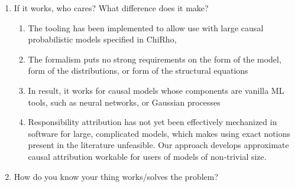 \documentclass{article}
\begin{document}
\begin{enumerate}
\begin{enumerate}
    \item push-forward causal impact score for variables of different types and supports, including allowing for continuous causes, witnesses, and outcomes
    \item using integration instead of existential quantifier, with the idea that this is closer to normality considerations
    \item This is achieved by causal probabilistic model transformations, which allow us to turn search into an inference problem (refer to search as inference stuff).
     \item This allows for the use of well-established approximation algorithms, which makes approximate search for explanations computationally feasible even for large-scale causal probabilistic models (refer to the HouseIQ example)
        

    \end{enumerate}
    \item If it works, who cares? What difference does it make?
    \begin{enumerate}
    \item The tooling has been implemented to allow use with large causal probabilistic models
    specified in ChiRho, 
    \item The formalism puts no strong requirements on the form of the model, form of the distributions, or form of the structural equations
    \item In result, it works for causal models whose components are vanilla ML tools, such as neural networks, or Gaussian processes
    \item Responsibility attribution has not yet been effectively mechanized in software for large, complicated models, which makes using exact notions present in the literature unfeasible. Our approach develops approximate causal attribution workable for users of models of non-trivial size.
    \end{enumerate}

    
    \item How do you know your thing works/solves the problem?
    

\end{enumerate}
\end{document}
